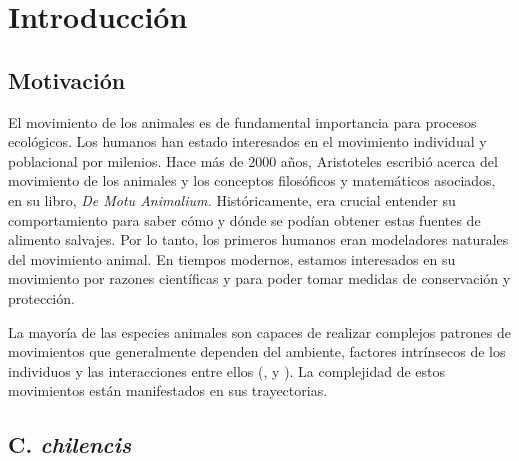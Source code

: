 \chapter{Introducción}
 
\section{Motivación}
El movimiento de los animales es de fundamental importancia para procesos ecológicos. Los humanos han estado interesados en el movimiento individual y poblacional por milenios. Hace más de 2000 años, Aristoteles escribió acerca del movimiento de los animales y los conceptos filosóficos y matemáticos asociados, en su libro, \textit{De Motu Animalium.} Históricamente, era crucial entender su comportamiento para saber cómo y dónde se podían obtener estas fuentes de alimento salvajes. Por lo tanto, los primeros humanos eran modeladores naturales del movimiento animal.  En tiempos modernos, estamos interesados en su movimiento por razones científicas y para poder tomar medidas de conservación y protección.
 
 
 
La mayoría de las especies animales son capaces de realizar complejos patrones de movimientos que generalmente dependen del ambiente, factores intrínsecos de los individuos y las interacciones entre ellos (\cite{morales2005adaptive}, \cite{morales2010building} y \cite{nathan2008emerging}). La complejidad de estos movimientos están manifestados en sus trayectorias. %
 
 
 
\section{ C. \textit{chilencis} }
\label{C chilencis}
 
